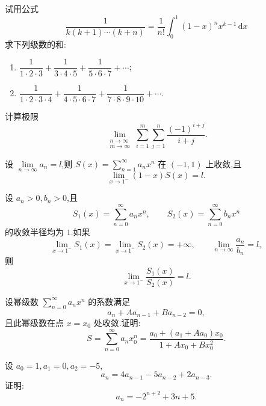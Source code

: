\documentclass[../数学分析培优讲义.tex]{subfiles}
\begin{document}
\begin{example}
试用公式
\[
    \dfrac{1}{k(k+1)\cdots(k+n)}
    =\dfrac{1}{n!}\int_0^1(1-x)^nx^{k-1}\,\mathrm{d}x
\]
求下列级数的和:
\begin{enumerate}[label=(\arabic*)]
    \item $\displaystyle\dfrac{1}{1\cdot2\cdot3}+\dfrac{1}{3\cdot4\cdot5}+\dfrac{1}{5\cdot6\cdot7}+\cdots$;
    \item $\displaystyle\dfrac{1}{1\cdot2\cdot3\cdot4}+\dfrac{1}{4\cdot5\cdot6\cdot7}+\dfrac{1}{7\cdot8\cdot9\cdot10}+\cdots$.
\end{enumerate}
\end{example}
\exampleblank

\begin{example}
计算极限
\[
    \lim\limits_{\substack{n\to\infty\\m\to\infty}}
    \sum\limits_{i=1}^{m}\sum\limits_{j=1}^{n}\dfrac{(-1)^{i+j}}{i+j}.
\]
\end{example}
\exampleblank

\begin{example}
设 $\displaystyle\lim\limits_{n\to\infty}a_n=l$,则 $\displaystyle S(x)=\sum\limits_{n=1}^{\infty}a_nx^n$ 在 $(-1,1)$ 上收敛,且
\[
    \lim\limits_{x\to1^-}(1-x)S(x)=l.
\]
\end{example}
\exampleblank

\begin{example}
设 $a_n>0,b_n>0$,且
\[
    S_1(x)=\sum\limits_{n=0}^{\infty}a_nx^n,
    \qquad
    S_2(x)=\sum\limits_{n=0}^{\infty}b_nx^n
\]
的收敛半径均为 $1$.如果
\[
    \lim\limits_{x\to1^-}S_1(x)=\lim\limits_{x\to1^-}S_2(x)=+\infty,
    \qquad
    \lim\limits_{n\to\infty}\dfrac{a_n}{b_n}=l,
\]
则
\[
    \lim\limits_{x\to1^-}\dfrac{S_1(x)}{S_2(x)}=l.
\]
\end{example}
\exampleblank

\begin{example}[\markstar]
设幂级数 $\displaystyle\sum\limits_{n=0}^{\infty}a_nx^n$ 的系数满足
\[
    a_n+Aa_{n-1}+Ba_{n-2}=0,
\]
且此幂级数在点 $x=x_0$ 处收敛.证明:
\[
    S=\sum\limits_{n=0}^{\infty}a_nx_0^n
    =\dfrac{a_0+(a_1+Aa_0)x_0}{1+Ax_0+Bx_0^2}.
\]
\end{example}
\exampleblank

\begin{example}
设 $a_0=1,a_1=0,a_2=-5$,
\[
    a_n=4a_{n-1}-5a_{n-2}+2a_{n-3}.
\]
证明:
\[
    a_n=-2^{n+2}+3n+5.
\]
\end{example}
\exampleblank
\end{document}
